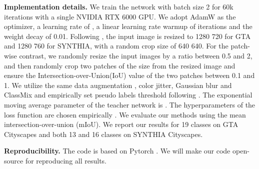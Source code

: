 \documentclass[10pt,twocolumn,letterpaper]{article}
\begin{document}
\noindent\textbf{Implementation details.}
We train the network with batch size 2 for 60k iterations with a single NVIDIA RTX 6000 GPU. 
We adopt AdamW \cite{loshchilov2017decoupled} as the optimizer, a learning rate of , a linear learning rate warmup of  iterations and the weight decay of 0.01. 
Following \cite{zhou2022context, BinhuiXie2022SePiCoSP}, the input image is resized to 1280  720 for GTA and 1280  760 for SYNTHIA, with a random crop size of 640  640. For the patch-wise contrast, we randomly resize the input images by a ratio between 0.5 and 2, and then randomly crop two patches of the size  from the resized image and ensure the Intersection-over-Union(IoU) value of the two patches between 0.1 and 1. 
We utilize the same data augmentation \eg, color jitter, Gaussian blur and ClassMix \cite{olsson2021classmix} and empirically set pseudo labels threshold  following \cite{WilhelmTranheden2020DACSDA}. The exponential moving average parameter of the teacher network is . The hyperparameters of the loss function are chosen empirically . 
We evaluate our methods using the mean intersection-over-union (mIoU). We report our results for 19 classes on GTA  Cityscapes and both 13 and 16 classes on SYNTHIA  Cityscapes.

\noindent\textbf{Reproducibility.} The code is based on Pytorch \cite{paszke2017automatic}. We will make our code open-source for reproducing all results.
\end{document}
